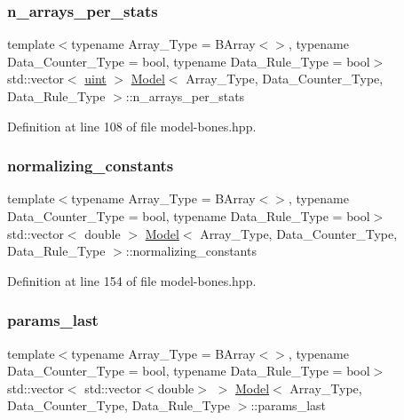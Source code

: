 \subsubsection{\texorpdfstring{n\+\_\+arrays\+\_\+per\+\_\+stats}{n\_arrays\_per\_stats}}
{\footnotesize\ttfamily template$<$typename Array\+\_\+\+Type = B\+Array$<$$>$, typename Data\+\_\+\+Counter\+\_\+\+Type = bool, typename Data\+\_\+\+Rule\+\_\+\+Type = bool$>$ \\
std\+::vector$<$ \hyperlink{typedefs_8hpp_a91ad9478d81a7aaf2593e8d9c3d06a14}{uint} $>$ \hyperlink{class_model}{Model}$<$ Array\+\_\+\+Type, Data\+\_\+\+Counter\+\_\+\+Type, Data\+\_\+\+Rule\+\_\+\+Type $>$\+::n\+\_\+arrays\+\_\+per\+\_\+stats}



Definition at line 108 of file model-\/bones.\+hpp.

\mbox{\label{class_model_aa4479d146005e89350dad6ba7bd8121a}} 
\subsubsection{\texorpdfstring{normalizing\+\_\+constants}{normalizing\_constants}}
{\footnotesize\ttfamily template$<$typename Array\+\_\+\+Type = B\+Array$<$$>$, typename Data\+\_\+\+Counter\+\_\+\+Type = bool, typename Data\+\_\+\+Rule\+\_\+\+Type = bool$>$ \\
std\+::vector$<$ double $>$ \hyperlink{class_model}{Model}$<$ Array\+\_\+\+Type, Data\+\_\+\+Counter\+\_\+\+Type, Data\+\_\+\+Rule\+\_\+\+Type $>$\+::normalizing\+\_\+constants}



Definition at line 154 of file model-\/bones.\+hpp.

\mbox{\label{class_model_add8183af946f2871480b6a6f9f1c8013}} 
\subsubsection{\texorpdfstring{params\+\_\+last}{params\_last}}
{\footnotesize\ttfamily template$<$typename Array\+\_\+\+Type = B\+Array$<$$>$, typename Data\+\_\+\+Counter\+\_\+\+Type = bool, typename Data\+\_\+\+Rule\+\_\+\+Type = bool$>$ \\
std\+::vector$<$ std\+::vector$<$double$>$ $>$ \hyperlink{class_model}{Model}$<$ Array\+\_\+\+Type, Data\+\_\+\+Counter\+\_\+\+Type, Data\+\_\+\+Rule\+\_\+\+Type $>$\+::params\+\_\+last}



